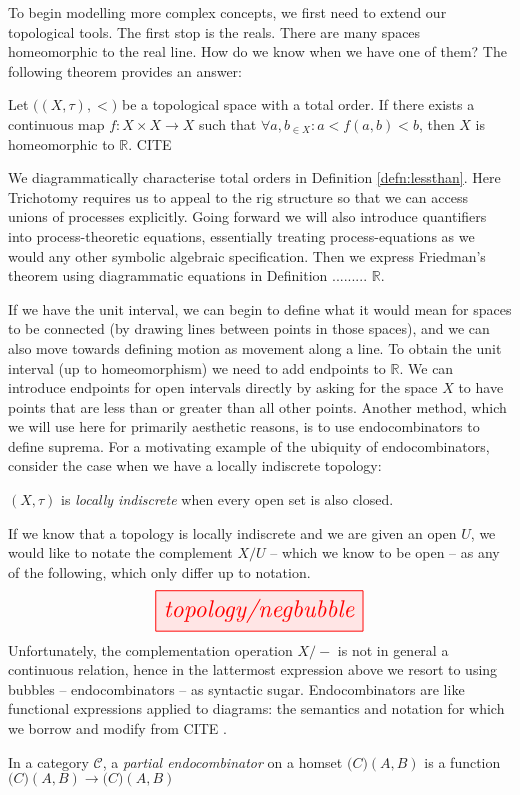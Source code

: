 To begin modelling more complex concepts, we first need to extend our topological tools. The first stop is the reals. There are many spaces homeomorphic to the real line. How do we know when we have one of them? The following theorem provides an answer:
\begin{theorem}[Friedman]\label{thm:Friedman}
Let $\big((X,\tau), < \big)$ be a topological space with a total order. If there exists a continuous map $f: X \times X \rightarrow X$ such that $\forall a,b_{\in X} : a < f(a,b) < b$, then $X$ is homeomorphic to $\mathbb{R}$.
\bR CITE \e
\end{theorem}
We diagrammatically characterise total orders in Definition \ref{defn:lessthan}. Here Trichotomy requires us to appeal to the rig structure so that we can access unions of processes explicitly. Going forward we will also introduce quantifiers into process-theoretic equations, essentially treating process-equations as we would any other symbolic algebraic specification. Then we express Friedman's theorem using diagrammatic equations in Definition ......... $\mathbb{R}$.

If we have the unit interval, we can begin to define what it would mean for spaces to be connected (by drawing lines between points in those spaces), and we can also move towards defining motion as movement along a line. To obtain the unit interval (up to homeomorphism) we need to add endpoints to $\mathbb{R}$. We can introduce endpoints for open intervals directly by asking for the space $X$ to have points that are less than or greater than all other points. Another method, which we will use here for primarily aesthetic reasons, is to use endocombinators to define suprema. For a motivating example of the ubiquity of endocombinators, consider the case when we have a locally indiscrete topology:
\begin{defn}
$(X,\tau)$ is \emph{locally indiscrete} when every open set is also closed.
\end{defn}
If we know that a topology is locally indiscrete and we are given an open $U$, we would like to notate the complement $X/U$ -- which we know to be open -- as any of the following, which only differ up to notation.
\[\resizebox{0.5\textwidth}{!}{\tikzfig{topology/negbubble}}\]
Unfortunately, the complementation operation $X/-$ is not in general a continuous relation, hence in the lattermost expression above we resort to using bubbles -- endocombinators -- as syntactic sugar. Endocombinators are like functional expressions applied to diagrams: the semantics and notation for which we borrow and modify from \bR CITE \e.
\begin{defn}
In a category $\mathcal{C}$, a \emph{partial endocombinator} on a homset $\mathcal(C)(A,B)$ is a function $\mathcal(C)(A,B) \rightarrow \mathcal(C)(A,B)$
\end{defn}

